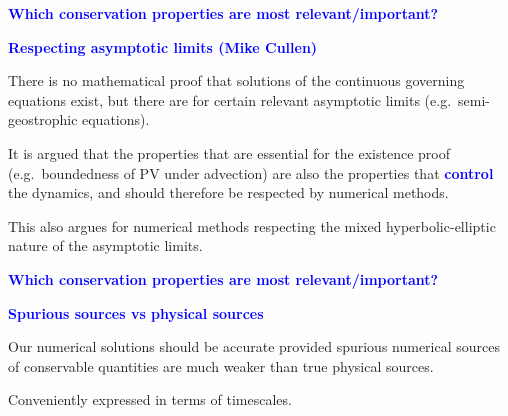 \documentclass[a4]{seminar}
\newcommand{\B}[1]{\textcolor{blue}{#1}}
\begin{document}
\begin{slide}

\B{\bf Which conservation properties are most relevant/important?}

\vspace{2mm}

\B{\bf Respecting asymptotic limits (Mike Cullen)} 

\vspace{2mm}

There is no mathematical proof that solutions of the continuous
governing equations exist, but there are for certain relevant
asymptotic limits (e.g.\ semi-geostrophic equations).

\vspace{2mm}

It is argued that the properties that are essential for the existence
proof (e.g.\ boundedness of PV under advection) are also the properties
that \B{\bf control} the dynamics, and should therefore be respected
by numerical methods.

\vspace{2mm}
This also argues for numerical methods respecting the mixed hyperbolic-elliptic
nature of the asymptotic limits.




\end{slide}


\begin{slide}


\B{\bf Which conservation properties are most relevant/important?}

\vspace{2mm}

\B{\bf Spurious sources vs physical sources} 

\vspace{3mm}

Our numerical solutions should be accurate provided
spurious numerical sources of conservable quantities
are much weaker than true physical sources.

\vspace{2mm}

Conveniently expressed in terms of timescales.



\end{slide}

\end{document}
